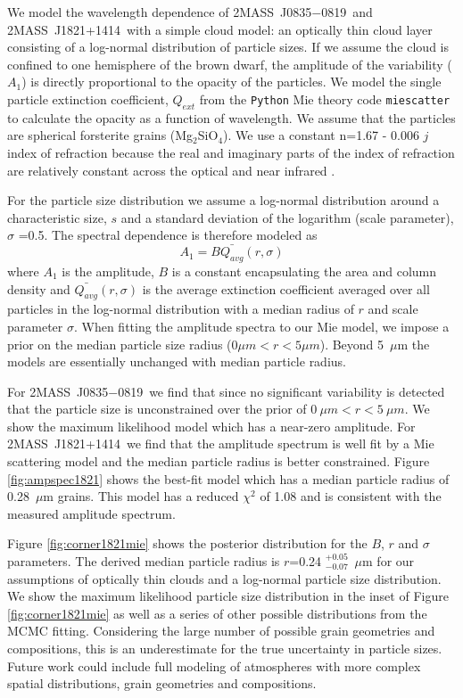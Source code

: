 \documentclass[twocolumn]{aastex6}
\newcommand{\sha}{2MASS~J0835$-$0819}
\newcommand{\shb}{2MASS~J1821+1414}
\begin{document}
We model the wavelength dependence of \sha\ and \shb\ with a simple cloud model: an optically thin cloud layer consisting of a log-normal distribution of particle sizes.
If we assume the cloud is confined to one hemisphere of the brown dwarf, the amplitude of the variability ($A_1$) is directly proportional to the opacity of the particles.
We model the single particle extinction coefficient, $Q_{ext}$ from the \texttt{Python} Mie theory code \texttt{miescatter} \citep{bohren1983mie} to calculate the opacity as a function of wavelength.
We assume that the particles are spherical forsterite grains (Mg$_2$SiO$_4$).
We use a constant n=1.67 - 0.006 $j$ index of refraction because the real and imaginary parts of the index of refraction are relatively constant across the optical and near infrared \citep{scott1996forsterite}.

For the particle size distribution we assume a log-normal distribution around a characteristic size, $s$ and a standard deviation of the logarithm (scale parameter), $\sigma$ =0.5.
The spectral dependence is therefore modeled as 
\begin{equation}
A_1 = B \bar{Q_{avg}}(r,\sigma)
\end{equation}
where $A_1$ is the amplitude, $B$ is a constant encapsulating the area and column density and $\bar{Q_{avg}}(r,\sigma)$ is the average extinction coefficient averaged over all particles in the log-normal distribution with a median radius of $r$ and scale parameter $\sigma$.
When fitting the amplitude spectra to our Mie model, we impose a prior on the median particle size radius ($0 \mu m < r < 5 \mu m$).
Beyond 5~$\mu$m the models are essentially unchanged with median particle radius.

For \sha\ we find that since no significant variability is detected that the particle size is unconstrained over the prior of $0~\mu m < r < 5~\mu m$.
We show the maximum likelihood model which has a near-zero amplitude.
For \shb\ we find that the amplitude spectrum is well fit by a Mie scattering model and the median particle radius is better constrained.
Figure \ref{fig:ampspec1821} shows the best-fit model which has a median particle radius of 0.28~$\mu$m grains.
This model has a reduced $\chi^2$ of 1.08 and is consistent with the measured amplitude spectrum.

Figure \ref{fig:corner1821mie} shows the posterior distribution for the $B$, $r$ and $\sigma$ parameters.
The derived median particle radius is $r$=0.24 $^{+0.05}_{-0.07}$~$\mu$m for our assumptions of optically thin clouds and a log-normal particle size distribution.
We show the maximum likelihood particle size distribution in the inset of Figure \ref{fig:corner1821mie} as well as a series of other possible distributions from the MCMC fitting.
Considering the large number of possible grain geometries and compositions, this is an underestimate for the true uncertainty in particle sizes.
Future work could include full modeling of atmospheres with more complex spatial distributions, grain geometries and compositions.
\end{document}
